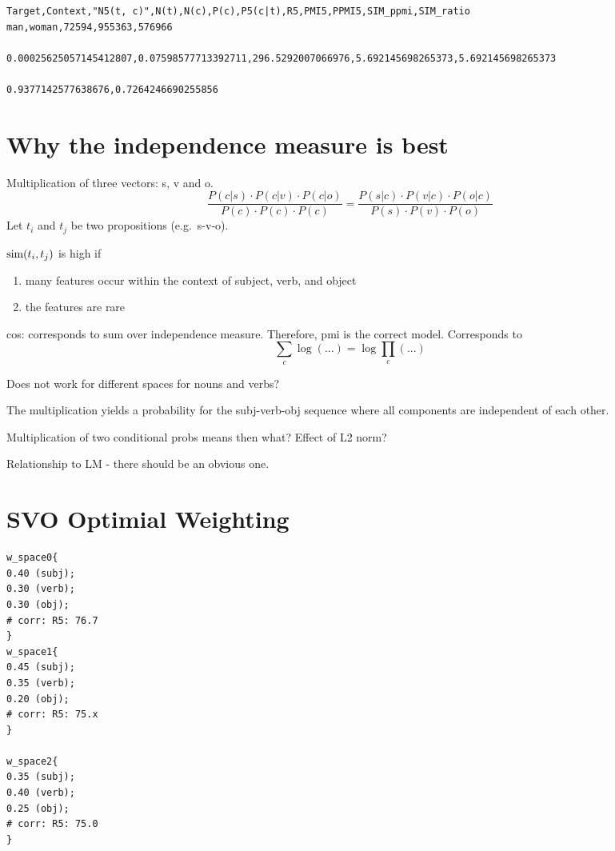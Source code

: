 \begin{verbatim}
Target,Context,"N5(t, c)",N(t),N(c),P(c),P5(c|t),R5,PMI5,PPMI5,SIM_ppmi,SIM_ratio
man,woman,72594,955363,576966

0.00025625057145412807,0.07598577713392711,296.5292007066976,5.692145698265373,5.692145698265373

0.9377142577638676,0.7264246690255856
\end{verbatim}


\section{Why the independence measure is best}

Multiplication of three vectors: s, v and o.
\[
\frac{
P(c|s) \cdot P(c|v) \cdot P(c|o)}{
P(c) \cdot P(c) \cdot P(c)} =
\frac{
P(s|c) \cdot P(v|c) \cdot P(o|c)
}{
P(s) \cdot P(v) \cdot P(o)
}
\]
Let $t_i$ and $t_j$ be two propositions
(e.g.~s-v-o).

$\textmd{sim}(t_i,t_j)$ is high if
\begin{enumerate}
\item many features occur within the context of subject, verb, and object
\item the features are rare
\end{enumerate}

cos: corresponds to sum over independence measure.
Therefore, pmi is the correct model.
Corresponds to
\[
\sum_c \log(...) = \log \prod_c(...)
\]



Does not work for different
spaces for nouns and verbs?

The multiplication yields a probability
for the subj-verb-obj sequence where all
components are independent of each other.

Multiplication of two conditional probs means then what?
Effect of L2 norm?


Relationship to LM - there should be an obvious one.

\section{SVO Optimial Weighting}

\begin{verbatim}
w_space0{
0.40 (subj);
0.30 (verb);
0.30 (obj);
# corr: R5: 76.7
}
w_space1{
0.45 (subj);
0.35 (verb);
0.20 (obj);
# corr: R5: 75.x
}

w_space2{
0.35 (subj);
0.40 (verb);
0.25 (obj);
# corr: R5: 75.0
}
\end{verbatim}



